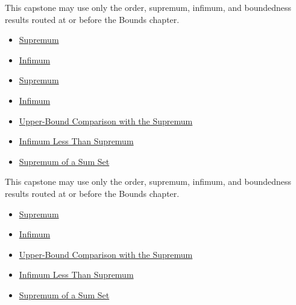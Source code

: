 \begin{remark*}[Interpretation]
This capstone may use only the order, supremum, infimum, and boundedness
results routed at or before the Bounds chapter.
\end{remark*}

\begin{remark*}
\begin{itemize}
  \item \hyperref[def:supremum]{Supremum}
  \item \hyperref[def:infimum]{Infimum}
\end{itemize}
\end{remark*}

\begin{remark*}
\begin{itemize}
  \item \hyperref[def:supremum]{Supremum}
  \item \hyperref[def:infimum]{Infimum}
  \item \hyperref[prop:upper-bound-comparison-with-the-supremum]{Upper-Bound Comparison with the Supremum}
  \item \hyperref[thm:infimum-less-than-supremum]{Infimum Less Than Supremum}
  \item \hyperref[thm:supremum-sum-set]{Supremum of a Sum Set}
\end{itemize}
\end{remark*}

\begin{remark*}
This capstone may use only the order, supremum, infimum, and boundedness
results routed at or before the Bounds chapter.
\end{remark*}

\begin{dependencies}
\begin{itemize}
  \item \hyperref[def:supremum]{Supremum}
  \item \hyperref[def:infimum]{Infimum}
  \item \hyperref[prop:upper-bound-comparison-with-the-supremum]{Upper-Bound Comparison with the Supremum}
  \item \hyperref[thm:infimum-less-than-supremum]{Infimum Less Than Supremum}
  \item \hyperref[thm:supremum-sum-set]{Supremum of a Sum Set}
\end{itemize}
\end{dependencies}

\clearpage
\fi
